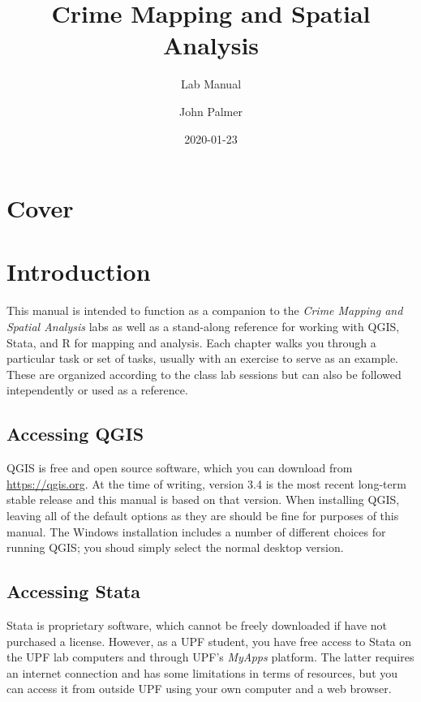 \documentclass[]{book}
\title{Crime Mapping and Spatial Analysis}
\subtitle{Lab Manual}
\author{John Palmer}
\date{2020-01-23}
\begin{document}
\maketitle

{
\setcounter{tocdepth}{1}
\tableofcontents
}
\hypertarget{cover}{%
\chapter*{Cover}\label{cover}}

\hypertarget{introduction}{%
\chapter*{Introduction}\label{introduction}}

This manual is intended to function as a companion to the \emph{Crime Mapping and Spatial Analysis} labs as well as a stand-along reference for working with QGIS, Stata, and R for mapping and analysis. Each chapter walks you through a particular task or set of tasks, usually with an exercise to serve as an example. These are organized according to the class lab sessions but can also be followed intependently or used as a reference.

\hypertarget{accessing-qgis}{%
\section*{Accessing QGIS}\label{accessing-qgis}}

QGIS is free and open source software, which you can download from \url{https://qgis.org}. At the time of writing, version 3.4 is the most recent long-term stable release and this manual is based on that version. When installing QGIS, leaving all of the default options as they are should be fine for purposes of this manual. The Windows installation includes a number of different choices for running QGIS; you shoud simply select the normal desktop version.

\hypertarget{accessing-stata}{%
\section*{Accessing Stata}\label{accessing-stata}}

Stata is proprietary software, which cannot be freely downloaded if have not purchased a license. However, as a UPF student, you have free access to Stata on the UPF lab computers and through UPF's \emph{MyApps} platform. The latter requires an internet connection and has some limitations in terms of resources, but you can access it from outside UPF using your own computer and a web browser.
\end{document}
